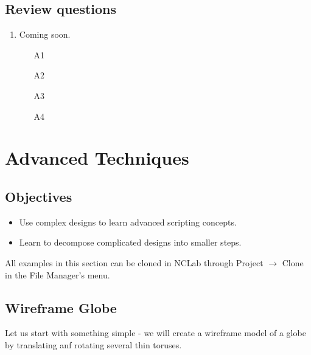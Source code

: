 \documentclass{article}
\begin{document}
\subsection{Review questions}

\begin{enumerate}
\item Coming soon.
\begin{itemize}
\item[A1]
\item[A2]
\item[A3]
\item[A4]
\end{itemize}
\end{enumerate}

\section{Advanced Techniques}

\subsection{Objectives}
\begin{itemize}
\item Use complex designs to learn advanced scripting concepts.
\item Learn to decompose complicated designs into smaller steps.
\end{itemize}
All examples in this section can be cloned in NCLab through 
Project $\rightarrow$ Clone in the File Manager's menu.

\subsection{Wireframe Globe}

Let us start with something simple - we will create a wireframe model 
of a globe by translating anf rotating several thin toruses.
\end{document}
